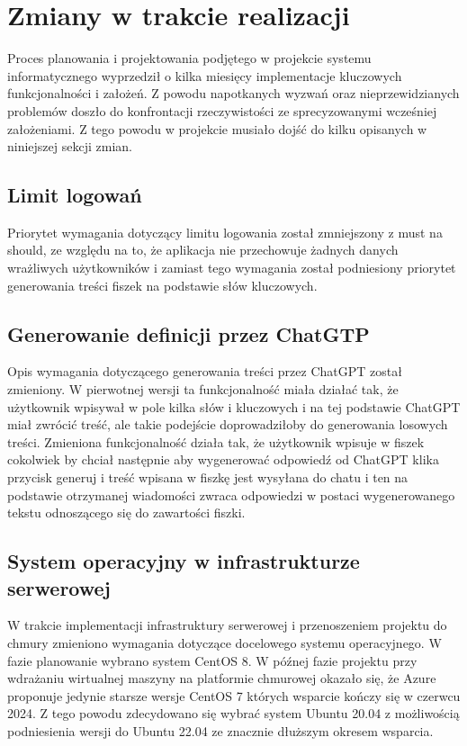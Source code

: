 \section{Zmiany w trakcie realizacji}
Proces planowania i projektowania podjętego w projekcie systemu informatycznego wyprzedził o kilka miesięcy implementacje kluczowych funkcjonalności i założeń. Z powodu napotkanych wyzwań oraz nieprzewidzianych problemów doszło do konfrontacji rzeczywistości ze sprecyzowanymi wcześniej założeniami. Z tego powodu w projekcie musiało dojść do kilku opisanych w niniejszej sekcji zmian.

\subsection{Limit logowań}
Priorytet wymagania dotyczący limitu logowania został zmniejszony z must na should, ze względu na to, że aplikacja nie przechowuje żadnych danych wrażliwych użytkowników i zamiast tego wymagania został podniesiony priorytet generowania treści fiszek na podstawie słów kluczowych.

\subsection{Generowanie definicji przez ChatGTP}
Opis wymagania dotyczącego generowania treści przez ChatGPT został zmieniony. W pierwotnej wersji ta funkcjonalność miała działać tak, że użytkownik wpisywał w pole kilka słów i kluczowych i na tej podstawie ChatGPT miał zwrócić treść, ale takie podejście doprowadziłoby do generowania losowych treści. Zmieniona funkcjonalność działa tak, że użytkownik wpisuje w fiszek cokolwiek by chciał następnie aby wygenerować odpowiedź od ChatGPT klika przycisk generuj i treść wpisana w fiszkę jest wysyłana do chatu i ten na podstawie otrzymanej wiadomości zwraca odpowiedzi w postaci wygenerowanego tekstu odnoszącego się do zawartości fiszki.

\subsection{System operacyjny w infrastrukturze serwerowej}
W trakcie implementacji infrastruktury serwerowej i przenoszeniem projektu do chmury zmieniono wymagania dotyczące docelowego systemu operacyjnego. W fazie planowanie wybrano system CentOS 8. W późnej fazie projektu przy wdrażaniu wirtualnej maszyny na platformie chmurowej okazało się, że Azure proponuje jedynie starsze wersje CentOS 7 których wsparcie kończy się w czerwcu 2024. Z tego powodu zdecydowano się wybrać system Ubuntu 20.04 z możliwością podniesienia wersji do Ubuntu 22.04 ze znacznie dłuższym okresem wsparcia.


